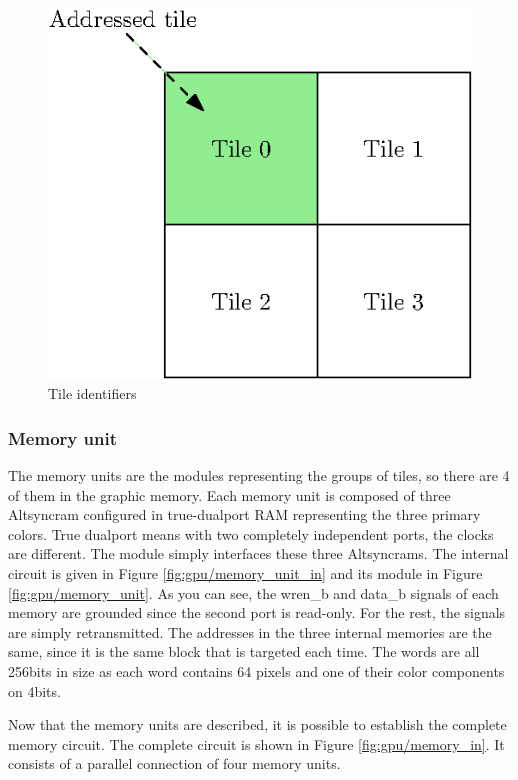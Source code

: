 \begin{figure}[H]
    \centering
    \includegraphics[scale=1.0]{Chapter4-GPU_CLKU/res/tile_ids}
    \caption{Tile identifiers}
    \label{fig:gpu/tile_ids}
\end{figure}

\subsubsection*{Memory unit}

The memory units are the modules representing the groups of tiles, so there are 4 of them in the 
graphic memory. Each memory unit is composed of three Altsyncram configured in true-dualport RAM 
representing the three primary colors. True dualport means with two completely independent ports, 
the clocks are different. The module simply interfaces these three Altsyncrams. The internal 
circuit is given in Figure \ref{fig:gpu/memory_unit_in} and its module in Figure 
\ref{fig:gpu/memory_unit}. As you can see, the wren\_b and data\_b signals 
of each memory are grounded since the second port is read-only. For the rest, the signals are 
simply retransmitted. The addresses in the three internal memories are the same, since it is the
same block that is targeted each time. The words are all 256bits in size as each word contains 64 
pixels and one of their color components on 4bits. 

Now that the memory units are described, it is possible to establish the complete memory circuit.
The complete circuit is shown in Figure \ref{fig:gpu/memory_in}. It consists of a parallel 
connection of four memory units. 

